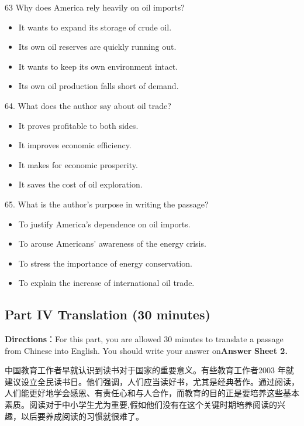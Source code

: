 \documentclass[UTF8,11pt]{ctexart}
\begin{document}
63 Why does America rely heavily on oil imports?


\begin{itemize}[leftmargin=2em,itemsep=.2em,topsep=.4em]\item[A.] It wants to expand its storage of crude oil.
\item[B.] Its own oil reserves are quickly running out.
\item[C.] It wants to keep its own environment intact.
\item[D.] Its own oil production falls short of demand.
\end{itemize}

64. What does the author say about oil trade?


\begin{itemize}[leftmargin=2em,itemsep=.2em,topsep=.4em]\item[A.] It proves profitable to both sides.
\item[B.] It improves economic efficiency.
\item[C.] It makes for economic prosperity.
\item[D.] It saves the cost of oil exploration.
\end{itemize}

65. What is the author’s purpose in writing the passage?


\begin{itemize}[leftmargin=2em,itemsep=.2em,topsep=.4em]\item[A.] To justify America’s dependence on oil imports.
\item[B.] To arouse Americans’ awareness of the energy crisis.
\item[C.] To stress the importance of energy conservation.
\item[D.] To explain the increase of international oil trade.
\end{itemize}

\subsection*{\textbf{Part IV} \textbf{Translation} \textbf{(30 minutes)}}


\textbf{Directions}：For this part, you are allowed 30 minutes to translate a passage from Chinese into English. You should write your answer on\textbf{Answer} \textbf{Sheet 2.}


中国教育工作者早就认识到读书对于国家的重要意义。有些教育工作者2003 年就建议设立全民读书日。他们强调，人们应当读好书，尤其是经典著作。通过阅读，人们能更好地学会感恩、有责任心和与人合作，而教育的目的正是要培养这些基本素质。阅读对于中小学生尤为重要,假如他们没有在这个关键时期培养阅读的兴趣，以后要养成阅读的习惯就很难了。
\end{document}
